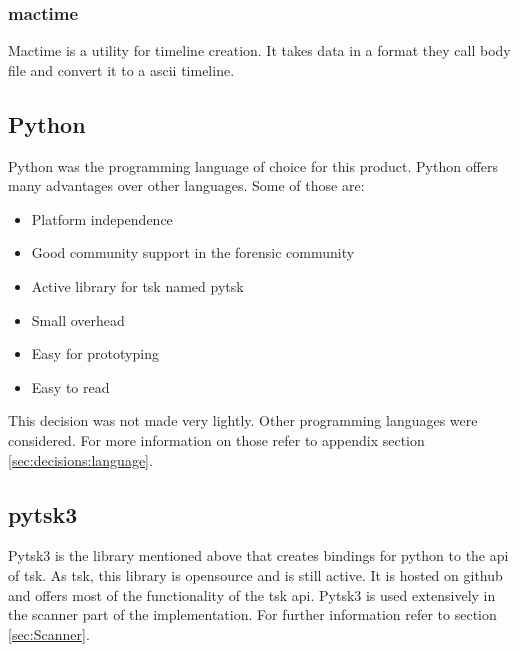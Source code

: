 \subsubsection{mactime}
\label{sec:mactime}

Mactime is a utility for timeline creation. It takes data in a format they call body file and convert it to a ascii timeline. \cite{tsk:mactime, tsk:bodyfile}

\subsection{Python}
\label{sec:python}

Python was the programming language of choice for this product. Python offers many advantages over other languages. Some of those are:

\begin{itemize}
    \item Platform independence
    \item Good community support in the forensic community
    \item Active library for \gls{tsk} named \gls{pytsk}
    \item Small overhead
    \item Easy for prototyping
    \item Easy to read
\end{itemize}

This decision was not made very lightly. Other programming languages were considered. For more information on those refer to appendix section \ref{sec:decisions:language}.

\subsection{pytsk3}
\label{sec:pytsk3}

Pytsk3 is the library mentioned above that creates bindings for python to the \gls{api} of \gls{tsk}. As \gls{tsk}, this library is \gls{opensource} and is still active. It is hosted on \gls{github} and offers most of the functionality of the \gls{tsk} \gls{api}. Pytsk3 is used extensively in the scanner part of the implementation. For further information refer to section \ref{sec:Scanner}.
